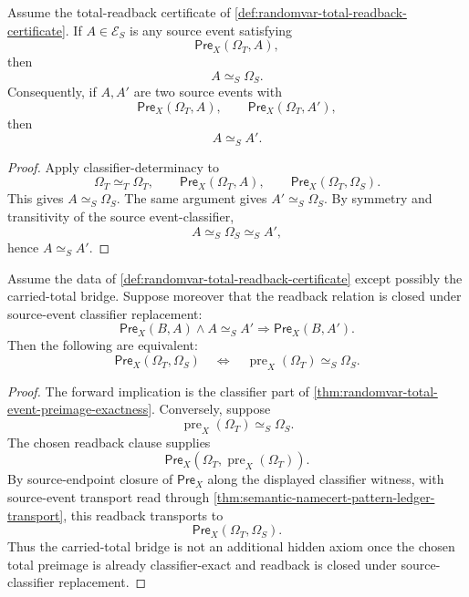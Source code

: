 \begin{theorem}
\label{thm:randomvar-terminal-readback-uniqueness-total-event}
Assume the total-readback certificate of \autoref{def:randomvar-total-readback-certificate}. If $A\in\mathcal E_S$ is any source event satisfying
$$
\mathsf{Pre}_X(\Omega_T,A),
$$
then
$$
A\simeq_S\Omega_S.
$$
Consequently, if $A,A'$ are two source events with
$$
\mathsf{Pre}_X(\Omega_T,A),\qquad \mathsf{Pre}_X(\Omega_T,A'),
$$
then
$$
A\simeq_S A'.
$$
\end{theorem}
\begin{proof}
Apply classifier-determinacy to
$$
\Omega_T\simeq_T\Omega_T,
\qquad
\mathsf{Pre}_X(\Omega_T,A),
\qquad
\mathsf{Pre}_X(\Omega_T,\Omega_S).
$$
This gives $A\simeq_S\Omega_S$. The same argument gives $A'\simeq_S\Omega_S$. By symmetry and transitivity of the source event-classifier,
$$
A\simeq_S\Omega_S\simeq_S A',
$$
hence $A\simeq_SA'$.
\end{proof}

\begin{proposition}
\label{prop:randomvar-total-exactness-carried-bridge-equivalence}
Assume the data of \autoref{def:randomvar-total-readback-certificate} except possibly the carried-total bridge. Suppose moreover that the readback relation is closed under source-event classifier replacement:
$$
\mathsf{Pre}_X(B,A)\wedge A\simeq_S A'
\Longrightarrow
\mathsf{Pre}_X(B,A').
$$
Then the following are equivalent:
$$
\mathsf{Pre}_X(\Omega_T,\Omega_S)
\quad\Longleftrightarrow\quad
\operatorname{pre}_X(\Omega_T)\simeq_S\Omega_S.
$$
\end{proposition}
\begin{proof}
The forward implication is the classifier part of \autoref{thm:randomvar-total-event-preimage-exactness}.
Conversely, suppose
$$
\operatorname{pre}_X(\Omega_T)\simeq_S\Omega_S.
$$
The chosen readback clause supplies
$$
\mathsf{Pre}_X(\Omega_T,\operatorname{pre}_X(\Omega_T)).
$$
By source-endpoint closure of $\mathsf{Pre}_X$ along the displayed classifier witness, with source-event transport read through \autoref{thm:semantic-namecert-pattern-ledger-transport}, this readback transports to
$$
\mathsf{Pre}_X(\Omega_T,\Omega_S).
$$
Thus the carried-total bridge is not an additional hidden axiom once the chosen total preimage is already classifier-exact and readback is closed under source-classifier replacement.
\end{proof}

